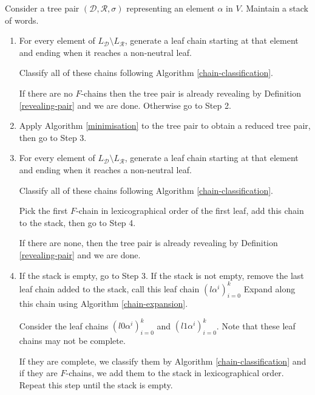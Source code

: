 \documentclass[12pt]{amsart}
\newcommand{\D}{\mathcal{D}}
\newcommand{\R}{\mathcal{R}}
\begin{document}
\begin{algorithm}
\label{slowest-rollings}
    Consider a tree pair $(\D,\R,\sigma)$ representing an element $\alpha$ in $V$. Maintain a stack of words.
    \begin{enumerate}[label=Step \arabic*:]
        \item For every element of $L_{\D}\setminus L_{\R}$, generate a leaf chain starting at that element and ending when it reaches a non-neutral leaf.
        
        Classify all of these chains following Algorithm \ref{chain-classification}.
        
        If there are no $F$-chains then the tree pair is already revealing by Definition \ref{revealing-pair} and we are done. Otherwise go to Step 2.
        
        \item Apply Algorithm \ref{minimisation} to the tree pair to obtain a reduced tree pair, then go to Step 3.
        
        \item For every element of $L_{\D}\setminus L_{\R}$, generate a leaf chain starting at that element and ending when it reaches a non-neutral leaf.
        
        Classify all of these chains following Algorithm \ref{chain-classification}.
        
        Pick the first $F$-chain in lexicographical order of the first leaf, add this chain to the stack, then go to Step 4.
        
        If there are none, then the tree pair is already revealing by Definition \ref{revealing-pair} and we are done.
        
        \item If the stack is empty, go to Step 3. 
        If the stack is not empty, remove the last leaf chain added to the stack, call this leaf chain $(l\alpha^i)_{i=0}^k$ Expand along this chain using Algorithm \ref{chain-expansion}.
        
        Consider the leaf chains $(l0\alpha^i)_{i=0}^k$ and $(l1\alpha^i)_{i=0}^k$. Note that these leaf chains may not be complete.
    
            
    If they are complete, we classify them by Algorithm \ref{chain-classification} and if they are $F$-chains, we add them to the stack in lexicographical order. Repeat this step until the stack is empty.
    \end{enumerate}
\end{algorithm}
\end{document}
